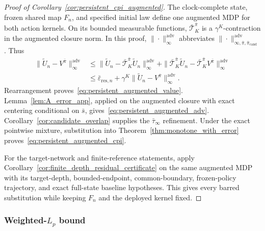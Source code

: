\documentclass{article}
\theoremstyle{plain}
\theoremstyle{definition}
\theoremstyle{remark}
\begin{document}
\begin{proof}[Proof of Corollary~\ref{cor:persistent_cpi_augmented}]
The clock-complete state, frozen shared map $F_n$, and specified initial law define one augmented MDP for both action kernels. On its bounded measurable functions, $\bar{\mathcal T}^{\bar\pi}_K$ is a $\gamma^K$-contraction in the augmented closure norm. In this proof, $\|\cdot\|_{\infty}^{\mathrm{adv}}$ abbreviates $\|\cdot\|_{\infty,\bar\pi,\bar\pi_{\mathrm{cand}}}^{\mathrm{adv}}$. Thus
\begin{align*}
\|\widetilde U_n-V^{\bar\pi}\|_{\infty}^{\mathrm{adv}}
&\le
\|\widetilde U_n-\bar{\mathcal T}^{\bar\pi}_K\widetilde U_n\|_{\infty}^{\mathrm{adv}}
+\|\bar{\mathcal T}^{\bar\pi}_K\widetilde U_n-\bar{\mathcal T}^{\bar\pi}_K V^{\bar\pi}\|_{\infty}^{\mathrm{adv}}\\
&\le \bar\varepsilon_{\mathrm{res},n}
+\gamma^K\|\widetilde U_n-V^{\bar\pi}\|_{\infty}^{\mathrm{adv}}.
\end{align*}
Rearrangement proves~\eqref{eq:persistent_augmented_value}. Lemma~\ref{lem:A_error_app}, applied on the augmented closure with exact centering conditional on $\bar s$, gives~\eqref{eq:persistent_augmented_adv}. Corollary~\ref{cor:candidate_overlap} supplies the $\bar\tau_\infty$ refinement. Under the exact pointwise mixture, substitution into Theorem~\ref{thm:monotone_with_error} proves~\eqref{eq:persistent_augmented_cpi}.

For the target-network and finite-reference statements, apply
Corollary~\ref{cor:finite_depth_residual_certificate} on the same augmented
MDP with its target-depth, bounded-endpoint, common-boundary, frozen-policy
trajectory, and exact full-state baseline hypotheses. This gives every
barred substitution while keeping $F_n$ and the deployed kernel fixed.
\end{proof}

\subsubsection{Weighted-\texorpdfstring{$L_p$}{Lp} bound}
\label{app:proof_weighted_lp}
\end{document}
